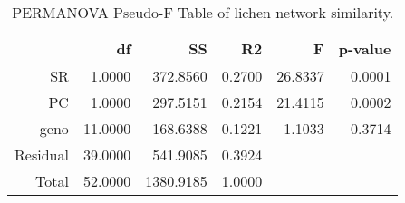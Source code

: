 \begin{table}[ht]
\centering
\begin{tabular}{rrrrrr}
  \hline
 & df & SS & R2 & F & p-value \\ 
  \hline
SR & 1.0000 & 372.8560 & 0.2700 & 26.8337 & 0.0001 \\ 
  PC & 1.0000 & 297.5151 & 0.2154 & 21.4115 & 0.0002 \\ 
  geno & 11.0000 & 168.6388 & 0.1221 & 1.1033 & 0.3714 \\ 
  Residual & 39.0000 & 541.9085 & 0.3924 &  &  \\ 
  Total & 52.0000 & 1380.9185 & 1.0000 &  &  \\ 
   \hline
\end{tabular}
\caption{PERMANOVA Pseudo-F Table of lichen network similarity.} 
\label{tab:cn_perm}
\end{table}
